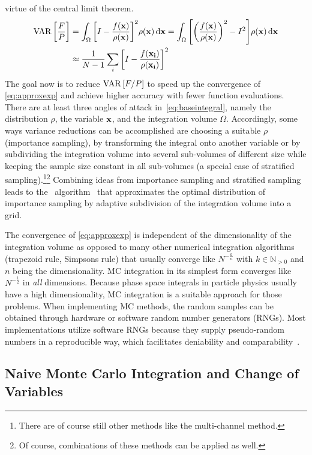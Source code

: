 virtue of the central limit theorem.
%
\begin{align}
  \operatorname{VAR}\qty[\frac{F}{P}] &= \int_\Omega \qty[I -
  \frac{f(\vb{x})}{\rho(\vb{x})}]^2 \rho({\vb{x}}) \dd{\vb{x}} =
  \int_\Omega \qty[\qty(\frac{f(\vb{x})}{\rho(\vb{x})})^2 -
  I^2]\rho({\vb{x}}) \dd{\vb{x}}   \label{eq:varI}
 \\
  &\approx \frac{1}{N - 1}\sum_i \qty[I -
  \frac{f(\vb{x_i})}{\rho(\vb{x_i})}]^2  \label{eq:varI-approx}
\end{align}
%
The goal now is to reduce \(\operatorname{VAR}\qty[F/P]\) to speed up the convergence
of \cref{eq:approxexp} and achieve higher accuracy with fewer function
evaluations. There are at least three angles of attack
in~\ref{eq:baseintegral}, namely the distribution \(\rho\), the
variable \(\vb{x}\), and the integration volume
\(\Omega\). Accordingly, some ways variance reductions can be
accomplished are choosing a suitable \(\rho\) (importance sampling),
by transforming the integral onto another variable or by subdividing
the integration volume into several sub-volumes of different size
while keeping the sample size constant in all sub-volumes (a special
case of stratified sampling).\footnote{There are of course still other
  methods like the multi-channel method.}\footnote{Of course,
  combinations of these methods can be applied as well.}  Combining
ideas from importance sampling and stratified sampling leads to the
\vegas\ algorithm~\cite{Lepage:19781an} that approximates the optimal
distribution of importance sampling by adaptive subdivision of the
integration volume into a grid.

The convergence of \cref{eq:approxexp} is independent of the
dimensionality of the integration volume as opposed to many other
numerical integration algorithms (trapezoid rule, Simpsons rule) that
usually converge like \(N^{-\frac{k}{n}}\) with
\(k\in\mathbb{N}_{>0}\) and \(n\) being the dimensionality.  MC
integration in its simplest form converges like \(N^{-\frac{1}{2}}\)
in \emph{all} dimensions. Because phase space integrals in particle
physics usually have a high dimensionality, MC integration is a
suitable approach for those problems. When implementing MC methods,
the random samples can be obtained through hardware or software random
number generators (RNGs). Most implementations utilize software RNGs
because they supply pseudo-random numbers in a reproducible way, which
facilitates deniability and comparability~\cite{buckley:2011ge}.

\subsection{Naive Monte Carlo Integration and Change of Variables}
\label{sec:naivechange}

